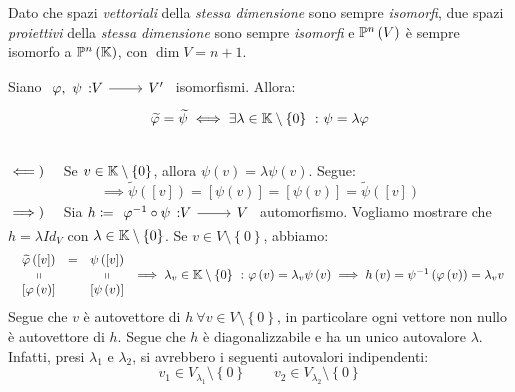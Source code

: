 Dato che spazi \textit{vettoriali} della \textit{stessa dimensione} sono sempre \textit{isomorfi}, due spazi \textit{proiettivi} della \textit{stessa dimensione} sono sempre \textit{isomorfi} e $\proj{V}$ è sempre isomorfo a $\proj[n]{\kamp}$, con $\dim V=n+1$.
\begin{lemming}
	Siano $\funz{\phi,\ \psi}{V}{V'}$ isomorfismi. Allora:
	\begin{equation}
		\widetilde{\phi}=\widetilde{\psi}\iff\exists\lambda\in\kamp\setminus\left\{0\right\}\ \colon\psi=\lambda\phi
	\end{equation}
\vspace{-6mm}
\end{lemming}
\begin{demonstration}~{}\\
$\impliedby)\quad$ Se $v\in\mathbb{K}\setminus\left\{0\right\}$, allora $\psi\left(v\right)=\lambda\psi\left(v\right)$. Segue:
\begin{equation*}
	\implies \widetilde{\psi}\left(\left[v\right]\right)=\left[\psi\left(v\right)\right]=\left[\psi\left(v\right)\right]=\widetilde{\psi}\left(\left[v\right]\right)
\end{equation*}
$\implies)\quad$ Sia $h\coloneqq \funz{\phi^{-1}\circ \psi}{V}{V}$ automorfismo. Vogliamo mostrare che $h=\lambda Id_V$ con $\lambda\in\mathbb{K}\setminus\left\{0\right\}$. Se $v\in V\setminus\left\{0\right\}$, abbiamo:
\begin{equation*}
	\begin{array}{c}
\begin{array}{ccc}
	\widetilde{\varphi}\left(\left[v\right]\right)&=&\psi\left(\left[v\right]\right)\\
	\shortparallel&&\shortparallel\\
	\left[\varphi\left(v\right)\right]&&\left[\psi\left(v\right)\right]
\end{array}
\implies \lambda_v\in\mathbb{K}\setminus\left\{0\right\}\ \colon \varphi\left(v\right)=\lambda_v\psi\left(v\right)
\implies h\left(v\right)=\psi^{-1}\left(\varphi\left(v\right)\right)=\lambda_v v
\end{array}
\end{equation*}
Segue che $v$ è autovettore di $h\ \forall v\in V\setminus\left\{0\right\}$, in particolare ogni vettore non nullo è autovettore di $h$. Segue che $h$ è diagonalizzabile e ha un unico autovalore $\lambda$. Infatti, presi $\lambda_1$ e $\lambda_2$, si avrebbero i seguenti autovalori indipendenti:
\begin{equation*}
	v_1\in V_{\lambda_1}\setminus\left\{0\right\}\qquad v_2\in V_{\lambda_2}\setminus\left\{0\right\}

\end{equation*}
\end{demonstration}
